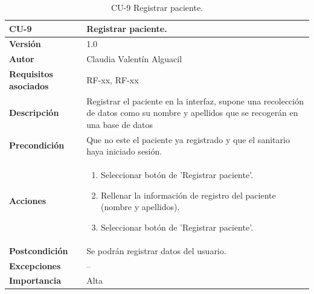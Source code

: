 \begin{table}[p]
	\centering
	\begin{tabularx}{\linewidth}{ p{} p{} }
		\toprule
		\textbf{CU-9}    & \textbf{Registrar paciente.}\\
		\toprule
		\textbf{Versión}              & 1.0    \\
		\textbf{Autor}                & Claudia Valentín Alguacil \\
		\textbf{Requisitos asociados} & RF-xx, RF-xx \\
		\textbf{Descripción}          & Registrar el paciente en la interfaz, supone una recolección de datos como su nombre y apellidos que se recogerán en una base de datos \\
		\textbf{Precondición}  & Que no este el paciente ya registrado y que el sanitario haya iniciado sesión.\\
		\textbf{Acciones}             &
		\begin{enumerate}
			\def\labelenumi{\arabic{enumi}.}
			\tightlist
                \item Seleccionar botón de 'Registrar paciente'.
                \item Rellenar la información de registro del paciente (nombre y apellidos).
                \item Seleccionar botón de 'Registrar paciente'.
		\end{enumerate}\\
		\textbf{Postcondición} &  Se podrán registrar datos del usuario. \\
		\textbf{Excepciones} & -- \\
		\textbf{Importancia}          & Alta \\
		\bottomrule
	\end{tabularx}
	\caption{CU-9 Registrar paciente.}
\end{table}



